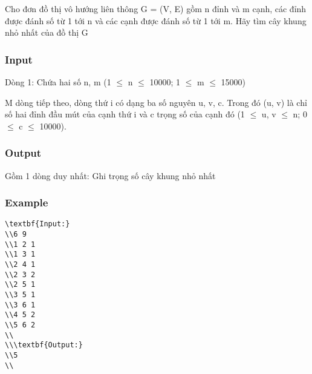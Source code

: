 



   Cho đơn đồ thị vô hướng liên thông G = (V, E) gồm n đỉnh và m cạnh, các đỉnh được đánh số từ 1 tới n và các cạnh được đánh số từ 1 tới m. Hãy tìm cây khung nhỏ nhất của đồ thị G  

\subsubsection{   Input  }

   Dòng 1: Chứa hai số n, m (1  $\le$  n  $\le$  10000; 1  $\le$  m  $\le$  15000)  

   M dòng tiếp theo, dòng thứ i có dạng ba số nguyên u, v, c. Trong đó (u, v) là chỉ số hai đỉnh đầu mút của cạnh thứ i và c trọng số của cạnh đó (1  $\le$  u, v  $\le$  n; 0  $\le$  c  $\le$  10000).  

\subsubsection{   Output  }

   Gồm 1 dòng duy nhất: Ghi trọng số cây khung nhỏ nhất  

\subsubsection{   Example  }
\begin{verbatim}
\textbf{Input:}
\\6 9
\\1 2 1
\\1 3 1
\\2 4 1
\\2 3 2
\\2 5 1
\\3 5 1
\\3 6 1
\\4 5 2
\\5 6 2
\\
\\\textbf{Output:}
\\5
\\\end{verbatim}
